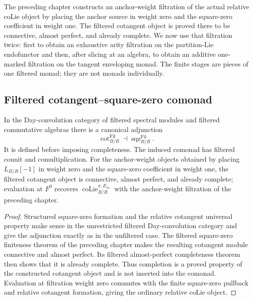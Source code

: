 The preceding chapter constructs an anchor-weight filtration of the actual
relative coLie object by placing the anchor source in weight zero and the
square-zero coefficient in weight one.  The filtered cotangent object is
proved there to be connective, almost perfect, and already complete.  We now
use that filtration twice: first to obtain an exhaustive arity filtration on
the partition-Lie endofunctor and then, after slicing at an algebra, to obtain
an additive one-marked filtration on the tangent enveloping monad.  The
finite stages are pieces of one filtered monad; they are not monads
individually.

\subsection{Filtered cotangent--square-zero comonad}

\begin{proposition}
\label{prop:as-filtered-cot-sqz}
In the Day-convolution category of filtered spectral modules and filtered
commutative algebras there is a canonical adjunction
\[
\boxed{
    \operatorname{cot}^{\mathrm{Fil}}_{B/R}
    \dashv
    \operatorname{sqz}^{\mathrm{Fil}}_{B/R}.
}
\]
It is defined before imposing completeness.  The induced comonad has filtered
counit and comultiplication.  For the anchor-weight objects obtained by
placing $L_{B/R}[-1]$ in weight zero and the square-zero coefficient in weight
one, the filtered cotangent object is connective, almost perfect, and already
complete; evaluation at $F^0$ recovers
$\operatorname{coLie}^{\pi,E_\infty}_{B/R}$ with the anchor-weight
filtration of the preceding chapter.
\end{proposition}

\begin{proof}
Structured square-zero formation and the relative cotangent universal
property make sense in the unrestricted filtered Day-convolution category and
give the adjunction exactly as in the unfiltered case.  The filtered
square-zero finiteness theorem of the preceding chapter makes the resulting
cotangent module connective and almost perfect.  Its filtered
almost-perfect completeness theorem then shows that it is already complete.
Thus completion is a proved property of the constructed cotangent object and
is not inserted into the comonad.  Evaluation at filtration weight zero
commutes with the finite square-zero pullback and relative cotangent
formation, giving the ordinary relative coLie object.
\end{proof}

